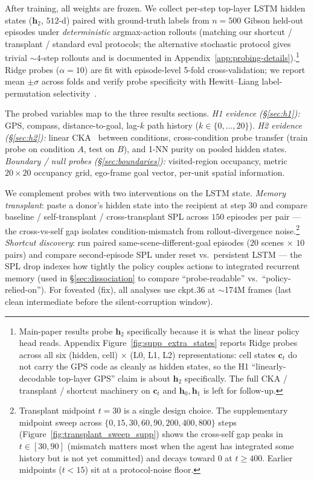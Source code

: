 \documentclass{article}
\begin{document}
After training, all weights are frozen. We collect per-step top-layer LSTM hidden states ($\mathbf{h}_2$, $512$-d) paired with ground-truth labels from $n{=}500$ Gibson held-out episodes under \emph{deterministic} argmax-action rollouts (matching our shortcut / transplant / standard eval protocols; the alternative stochastic protocol gives trivial $\sim 4$-step rollouts and is documented in Appendix~\ref{app:probing-details}).\footnote{\small Main-paper results probe $\mathbf{h}_2$ specifically because it is what the linear policy head reads. Appendix Figure~\ref{fig:supp_extra_states} reports Ridge probes across all six (hidden, cell) $\times$ (L0, L1, L2) representations: cell states $\mathbf{c}_t$ do not carry the GPS code as cleanly as hidden states, so the H1 ``linearly-decodable top-layer GPS'' claim is about $\mathbf{h}_2$ specifically. The full CKA / transplant / shortcut machinery on $\mathbf{c}_t$ and $\mathbf{h}_0, \mathbf{h}_1$ is left for follow-up.} Ridge probes ($\alpha=10$) are fit with episode-level 5-fold cross-validation; we report mean $\pm \sigma$ across folds and verify probe specificity with Hewitt--Liang label-permutation selectivity~\citep{hewitt2019control}.

The probed variables map to the three results sections. \emph{H1 evidence (§\ref{sec:h1}):} GPS, compass, distance-to-goal, lag-$k$ path history ($k \in \{0, \ldots, 20\}$). \emph{H2 evidence (§\ref{sec:h2}):} linear CKA~\citep{kornblith2019cka} between conditions, cross-condition probe transfer (train probe on condition $A$, test on $B$), and 1-NN purity on pooled hidden states. \emph{Boundary / null probes (§\ref{sec:boundaries}):} visited-region occupancy, metric $20{\times}20$ occupancy grid, ego-frame goal vector, per-unit spatial information.

We complement probes with two interventions on the LSTM state. \emph{Memory transplant}: paste a donor's hidden state into the recipient at step $30$ and compare baseline / self-transplant / cross-transplant SPL across $150$ episodes per pair --- the cross-vs-self gap isolates condition-mismatch from rollout-divergence noise.\footnote{\small Transplant midpoint $t{=}30$ is a single design choice. The supplementary midpoint sweep across $\{0, 15, 30, 60, 90, 200, 400, 800\}$ steps (Figure~\ref{fig:transplant_sweep_supp}) shows the cross-self gap peaks in $t \in [30, 90]$ (mismatch matters most when the agent has integrated some history but is not yet committed) and decays toward 0 at $t \geq 400$. Earlier midpoints ($t < 15$) sit at a protocol-noise floor.} \emph{Shortcut discovery}: run paired same-scene-different-goal episodes ($20$ scenes $\times$ $10$ pairs) and compare second-episode SPL under reset vs.\ persistent LSTM --- the SPL drop indexes how tightly the policy couples actions to integrated recurrent memory (used in §\ref{sec:dissociation} to compare ``probe-readable'' vs.\ ``policy-relied-on''). For foveated (fix), all analyses use ckpt.36 at $\sim$174M frames (last clean intermediate before the silent-corruption window).
\end{document}
